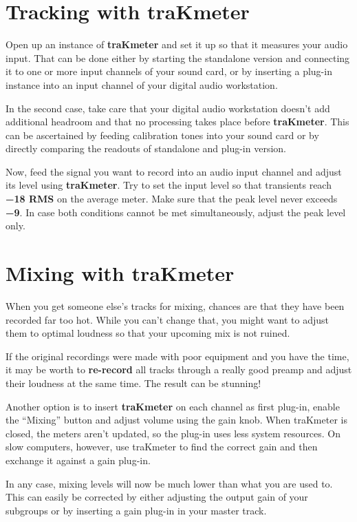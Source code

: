 \section{Tracking with traKmeter}
\label{sec:tracking_with_trakmeter}

Open up an instance of \textbf{traKmeter} and set it up so that it
measures your audio input.  That can be done either by starting the
standalone version and connecting it to one or more input channels of
your sound card, or by inserting a plug-in instance into an input
channel of your digital audio workstation.

In the second case, take care that your digital audio workstation
doesn't add additional headroom and that no processing takes place
before \textbf{traKmeter}.  This can be ascertained by feeding
calibration tones into your sound card or by directly comparing the
readouts of standalone and plug-in version.

Now, feed the signal you want to record into an audio input channel
and adjust its level using \textbf{traKmeter}.  Try to set the input
level so that transients reach \textbf{\SI{-18}{\dBFS} RMS} on the
average meter.  Make sure that the peak level never exceeds
\textbf{\SI{-9}{\dBFS}}.  In case both conditions cannot be met
simultaneously, adjust the peak level only.

\section{Mixing with traKmeter}
\label{sec:mixing_with_trakmeter}

When you get someone else's tracks for mixing, chances are that they
have been recorded far too hot.  While you can't change that, you
might want to adjust them to optimal loudness so that your upcoming
mix is not ruined.

If the original recordings were made with poor equipment and you have
the time, it may be worth to \textbf{re-record} all tracks through a
really good preamp and adjust their loudness at the same time.  The
result can be stunning!

Another option is to insert \textbf{traKmeter} on each channel as
first plug-in, enable the ``Mixing'' button and adjust volume using
the gain knob.  When traKmeter is closed, the meters aren't updated,
so the plug-in uses less system resources.  On slow computers,
however, use traKmeter to find the correct gain and then exchange it
against a gain plug-in.

In any case, mixing levels will now be much lower than what you are
used to.  This can easily be corrected by either adjusting the output
gain of your subgroups or by inserting a gain plug-in in your master
track.

